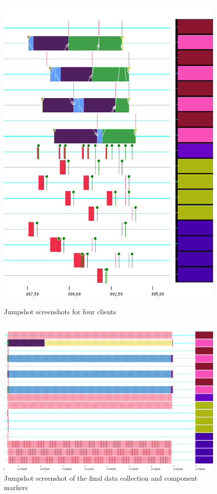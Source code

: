 \documentclass[
     11pt,         %
     a4paper,      %
     BCOR10mm,     %
     DIV14,        %
     liststotoc,   %
     bibtotoc,     %
     idxtotoc,     %
     parskip       %
     ]{scrreprt}   %
\begin{document}
\begin{figure}[!htbp]
{\includegraphics[scale=0.5]{Images/jumpshot-screenshot-1.png}
}

 \caption{Jumpshot screenshots for four clients}
   \label{fig:jumpshot_legend}
\end{figure}


\begin{figure}[!htbp]
  \centering
\includegraphics[scale=0.4]{Images/jumpshot-screenshot-2.png}
    \caption{Jumpshot screenshot of the final data collection and component markers}
    \label{fig:jumpshot_screenshot_2}
\end{figure}
\end{document}
